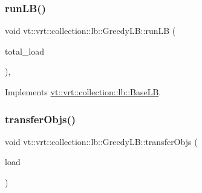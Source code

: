 \mbox{\label{structvt_1_1vrt_1_1collection_1_1lb_1_1_greedy_l_b_abe03de3d4ee3b1259707a9d5b22a7b9c}} 
\subsubsection{\texorpdfstring{run\+L\+B()}{runLB()}}
{\footnotesize\ttfamily void vt\+::vrt\+::collection\+::lb\+::\+Greedy\+L\+B\+::run\+LB (\begin{DoxyParamCaption}\item[{\hyperlink{namespacevt_a8fb51741340b87d7aaee0bef60e9896b}{Load\+Type}}]{total\+\_\+load }\end{DoxyParamCaption})\hspace{0.3cm}{\ttfamily [override]}, {\ttfamily [virtual]}}



Implements \hyperlink{structvt_1_1vrt_1_1collection_1_1lb_1_1_base_l_b_aa957038bb132ac29fb61535487f0604f}{vt\+::vrt\+::collection\+::lb\+::\+Base\+LB}.

\mbox{\label{structvt_1_1vrt_1_1collection_1_1lb_1_1_greedy_l_b_a329b105a21240dd33a53d06080b035da}} 
\subsubsection{\texorpdfstring{transfer\+Objs()}{transferObjs()}}
{\footnotesize\ttfamily void vt\+::vrt\+::collection\+::lb\+::\+Greedy\+L\+B\+::transfer\+Objs (\begin{DoxyParamCaption}\item[{std\+::vector$<$ \hyperlink{structvt_1_1vrt_1_1collection_1_1lb_1_1_greedy_proc}{Greedy\+Proc} $>$ \&\&}]{load }\end{DoxyParamCaption})\hspace{0.3cm}{\ttfamily [private]}}



